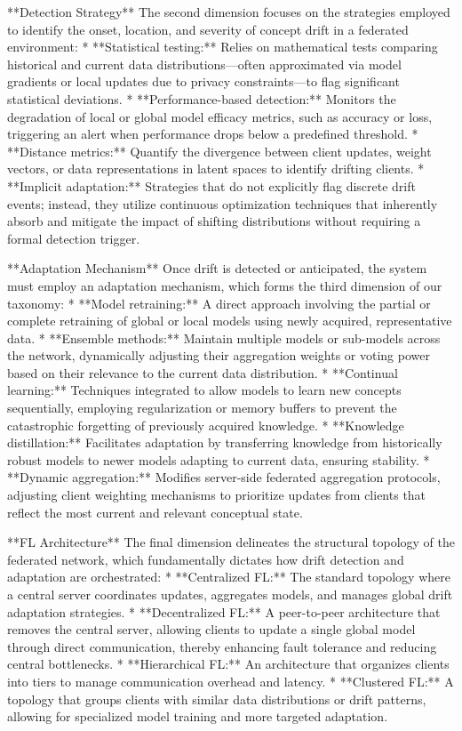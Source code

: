 \documentclass[journal]{IEEEtran}
\begin{document}
**Detection Strategy**
The second dimension focuses on the strategies employed to identify the onset, location, and severity of concept drift in a federated environment:
*   **Statistical testing:** Relies on mathematical tests comparing historical and current data distributions—often approximated via model gradients or local updates due to privacy constraints—to flag significant statistical deviations.
*   **Performance-based detection:** Monitors the degradation of local or global model efficacy metrics, such as accuracy or loss, triggering an alert when performance drops below a predefined threshold.
*   **Distance metrics:** Quantify the divergence between client updates, weight vectors, or data representations in latent spaces to identify drifting clients.
*   **Implicit adaptation:** Strategies that do not explicitly flag discrete drift events; instead, they utilize continuous optimization techniques that inherently absorb and mitigate the impact of shifting distributions without requiring a formal detection trigger.

**Adaptation Mechanism**
Once drift is detected or anticipated, the system must employ an adaptation mechanism, which forms the third dimension of our taxonomy:
*   **Model retraining:** A direct approach involving the partial or complete retraining of global or local models using newly acquired, representative data.
*   **Ensemble methods:** Maintain multiple models or sub-models across the network, dynamically adjusting their aggregation weights or voting power based on their relevance to the current data distribution.
*   **Continual learning:** Techniques integrated to allow models to learn new concepts sequentially, employing regularization or memory buffers to prevent the catastrophic forgetting of previously acquired knowledge.
*   **Knowledge distillation:** Facilitates adaptation by transferring knowledge from historically robust models to newer models adapting to current data, ensuring stability.
*   **Dynamic aggregation:** Modifies server-side federated aggregation protocols, adjusting client weighting mechanisms to prioritize updates from clients that reflect the most current and relevant conceptual state.

**FL Architecture**
The final dimension delineates the structural topology of the federated network, which fundamentally dictates how drift detection and adaptation are orchestrated:
*   **Centralized FL:** The standard topology where a central server coordinates updates, aggregates models, and manages global drift adaptation strategies.
*   **Decentralized FL:** A peer-to-peer architecture that removes the central server, allowing clients to update a single global model through direct communication, thereby enhancing fault tolerance and reducing central bottlenecks.
*   **Hierarchical FL:** An architecture that organizes clients into tiers to manage communication overhead and latency.
*   **Clustered FL:** A topology that groups clients with similar data distributions or drift patterns, allowing for specialized model training and more targeted adaptation.
\end{document}
